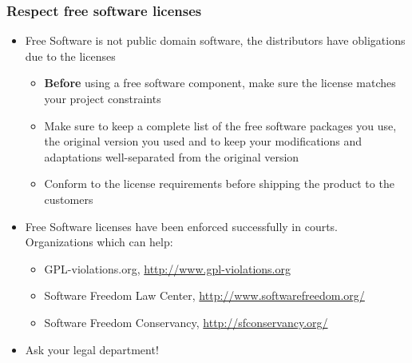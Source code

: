 \begin{frame}
  \frametitle{Respect free software licenses}
  \begin{itemize}
  \item Free Software is not public domain software, the distributors
    have obligations due to the licenses
    \begin{itemize}
    \item {\bf Before} using a free software component, make sure the
      license matches your project constraints
    \item Make sure to keep a complete list of the free software
      packages you use, the original version you used and to keep your
      modifications and adaptations well-separated from the original
      version
    \item Conform to the license requirements before shipping the
      product to the customers
    \end{itemize}
  \item Free Software licenses have been enforced successfully in
    courts. Organizations which can help:
    \begin{itemize}
    \item GPL-violations.org, \url{http://www.gpl-violations.org}
    \item Software Freedom Law Center, \url{http://www.softwarefreedom.org/}
    \item Software Freedom Conservancy, \url{http://sfconservancy.org/}
    \end{itemize}
  \item Ask your legal department!
  \end{itemize}
\end{frame}

